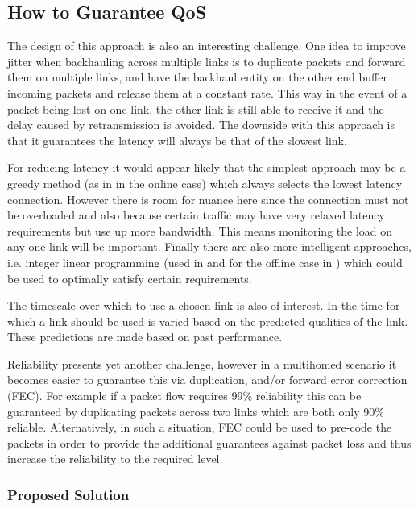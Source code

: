 \subsection{How to Guarantee QoS}

The design of this approach is also an interesting challenge. One idea to improve jitter when backhauling across multiple links is to duplicate packets and forward them on multiple links, and have the backhaul entity on the other end buffer incoming packets and release them at a constant rate. This way in the event of a packet being lost on one link, the other link is still able to receive it and the delay caused by retransmission is avoided. The downside with this approach is that it guarantees the latency will always be that of the slowest link.

For reducing latency it would appear likely that the simplest approach may be a greedy method (as in \cite{goldenberg2004optimizing} in the online case) which always selects the lowest latency connection. However there is room for nuance here since the connection must not be overloaded and also because certain traffic may have very relaxed latency requirements but use up more bandwidth. This means monitoring the load on any one link will be important. Finally there are also more intelligent approaches, i.e. integer linear programming (used in \cite{huang2008multiconstrained} and for the offline case in \cite{goldenberg2004optimizing}) which could be used to optimally satisfy certain requirements.

The timescale over which to use a chosen link is also of interest. In \cite{habib2007improving} the time for which a link should be used is varied based on the predicted qualities of the link. These predictions are made based on past performance.

Reliability presents yet another challenge, however in a multihomed scenario it becomes easier to guarantee this via duplication, and/or forward error correction (FEC). For example if a packet flow requires 99\% reliability this can be guaranteed by duplicating packets across two links which are both only 90\% reliable. Alternatively, in such a situation, FEC could be used to pre-code the packets in order to provide the additional guarantees against packet loss and thus increase the reliability to the required level.

\subsubsection{Proposed Solution}

